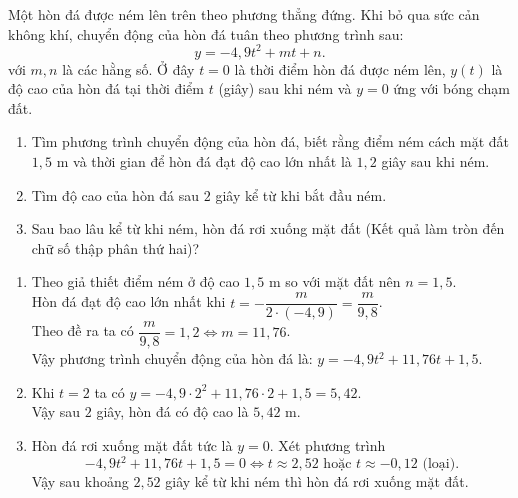 \begin{bt}%
	Một hòn đá được ném lên trên theo phương thẳng đứng. Khi bỏ qua sức cản không khí, chuyển động của hòn đá tuân theo phương trình sau:
	\[y=-4{,}9 t^2+m t+n.\]
	với $m, n$ là các hằng số. Ở đây $t=0$ là thời điểm hòn đá được ném lên, $y(t)$ là độ cao của hòn đá tại thời điểm $t$ (giây) sau khi ném và $y=0$ ứng với bóng chạm đất.
	\begin{enumerate}
		\item Tìm phương trình chuyển động của hòn đá, biết rằng điểm ném cách mặt đất $1{,}5$ m và thời gian để hòn đá đạt độ cao lớn nhất là $1{,}2$ giây sau khi ném.
		\item Tìm độ cao của hòn đá sau $2$ giây kể từ khi bắt đầu ném.
		\item Sau bao lâu kể từ khi ném, hòn đá rơi xuống mặt đất (Kết quả làm tròn đến chữ số thập phân thứ hai)?
	\end{enumerate}
	\loigiai
	{
		\begin{enumerate}
			\item Theo giả thiết điểm ném ở độ cao $1{,}5$ m so với mặt đất nên $n=1{,}5$. \\
			Hòn đá đạt độ cao lớn nhất khi $t=-\dfrac{m}{2 \cdot(-4{,}9)}=\dfrac{m}{9{,}8}$.\\
			Theo đề ra ta có $\dfrac{m}{9{,}8}=1{,}2 \Leftrightarrow m=11{,}76$.\\
			Vậy phương trình chuyển động của hòn đá là: $y=-4{,}9 t^2+11{,}76 t+1{,}5$.
			\item Khi $t=2$ ta có $y=-4{,}9 \cdot 2^2+11{,}76 \cdot 2+1{,}5=5{,}42$.\\
			Vậy sau $2$ giây, hòn đá có độ cao là $5{,}42$ m.
			\item Hòn đá rơi xuống mặt đất tức là $y=0$. Xét phương trình 
			\[-4{,}9 t^2+11{,}76 t+1{,}5=0 \Leftrightarrow t \approx 2{,}52 \text{ hoặc } t \approx -0{,}12 \text{ (loại)}.\]
			Vậy sau khoảng $2{,}52$ giây kể từ khi ném thì hòn đá rơi xuống mặt đất.
		\end{enumerate}
	}
\end{bt}

